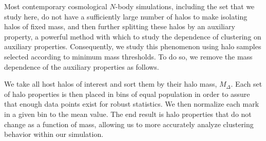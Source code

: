 \documentclass[usenatbib,usegraphicx,letterpaper]{mn2e}
\begin{document}
Most contemporary cosmological $N$-body simulations, including the set that we study here, 
do not have a sufficiently large number of halos to make isolating halos of fixed mass, and then further 
splitting these halos by an auxiliary property, a powerful method with which to study the dependence of 
clustering on auxiliary properties. Consequently, we study this phenomenon using halo samples 
selected according to minimum mass thresholds. To do so, we remove the mass dependence of 
the auxiliary properties as follows. 

We take all host halos of interest and sort them by their halo mass, $M_{\Delta}$. 
Each set of halo properties is then placed in bins of equal population in order to assure 
that enough data points exist for robust statistics. We then normalize each mark in a 
given bin to the mean value. The end result is halo properties that do not 
change as a function of mass, allowing us to more accurately analyze clustering behavior within our simulation. 
\end{document}
